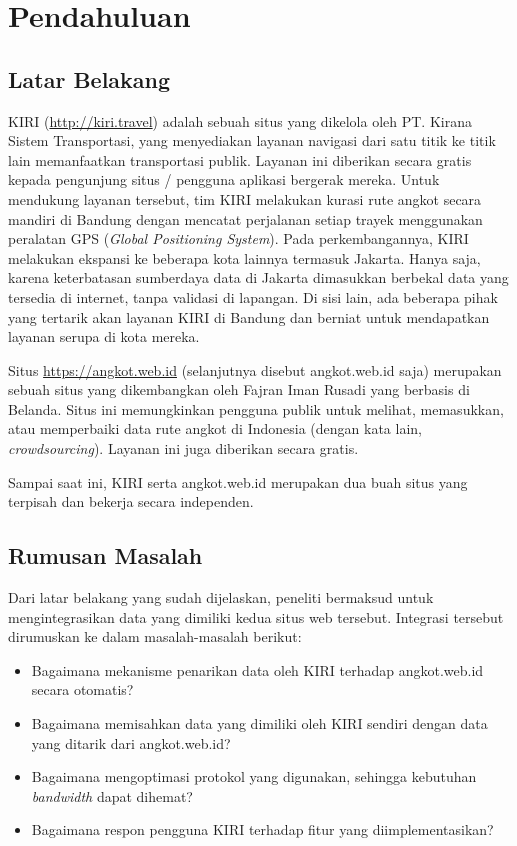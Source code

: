 \chapter{Pendahuluan}
\label{chap:pendahuluan}

\section{Latar Belakang}
\label{sec:latar_belakang}

KIRI (\url{http://kiri.travel}) adalah sebuah situs yang dikelola oleh PT.
Kirana Sistem Transportasi, yang menyediakan layanan navigasi dari satu titik
ke titik lain memanfaatkan transportasi publik. Layanan ini diberikan secara
gratis kepada pengunjung situs / pengguna aplikasi bergerak mereka. Untuk
mendukung layanan tersebut, tim KIRI melakukan kurasi rute angkot secara
mandiri di Bandung dengan mencatat perjalanan setiap trayek menggunakan
peralatan GPS (\textit{Global Positioning System}). Pada perkembangannya, KIRI
melakukan ekspansi ke beberapa kota lainnya termasuk Jakarta. Hanya saja,
karena keterbatasan sumberdaya data di Jakarta dimasukkan berbekal data yang
tersedia di internet, tanpa validasi di lapangan. Di sisi lain, ada beberapa
pihak yang tertarik akan layanan KIRI di Bandung dan berniat untuk mendapatkan
layanan serupa di kota mereka.

Situs \url{https://angkot.web.id} (selanjutnya disebut angkot.web.id saja)
merupakan sebuah situs yang dikembangkan oleh Fajran Iman Rusadi yang berbasis
di Belanda. Situs ini memungkinkan pengguna publik untuk melihat, memasukkan, 
atau memperbaiki data rute angkot di Indonesia (dengan kata lain,
\textit{crowdsourcing}). Layanan ini juga diberikan secara gratis.

Sampai saat ini, KIRI serta angkot.web.id merupakan dua buah situs yang
terpisah dan bekerja secara independen.

\section{Rumusan Masalah}
\label{sec:rumusan_masalah}
Dari latar belakang yang sudah dijelaskan, peneliti bermaksud untuk mengintegrasikan
data yang dimiliki kedua situs web tersebut. Integrasi tersebut dirumuskan ke dalam
masalah-masalah berikut:
\begin{itemize}
	\item Bagaimana mekanisme penarikan data oleh KIRI terhadap angkot.web.id
		secara otomatis?
	\item Bagaimana memisahkan data yang dimiliki oleh KIRI sendiri dengan data
		yang ditarik dari angkot.web.id?
	\item Bagaimana mengoptimasi protokol yang digunakan, sehingga kebutuhan
		\textit{bandwidth} dapat dihemat?
	\item Bagaimana respon pengguna KIRI terhadap fitur yang diimplementasikan?
\end{itemize}

